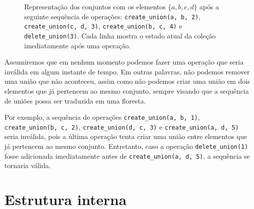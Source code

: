 \begin{figure}[h!]
\begin{subfigure}{\textwidth}
        \bigskip
    \end{subfigure}
    \begin{subfigure}{\textwidth}
        \centering
    \end{subfigure}
    \caption{Representação dos conjuntos com os elementos $\{a,b,c,d\}$ após a seguinte sequência de operações: \texttt{create\_union(a, b, 2)}, \texttt{create\_union(c, d, 3)}, \texttt{create\_union(b, c, 4)} e\\\texttt{delete\_union(3)}. Cada linha mostra o estado atual da coleção imediatamente após uma operação.}
    \label{fig:uf-sets}
\end{figure}

Assumiremos que em nenhum momento podemos fazer uma operação que seria inválida em algum instante de tempo. Em outras palavras, não podemos remover uma união que não aconteceu, assim como não podemos criar uma união em dois elementos que já pertencem ao mesmo conjunto, sempre visando que a sequência de uniões possa ser traduzida em uma floresta.

Por exemplo, a sequência de operações \texttt{create\_union(a, b, 1)}, \texttt{create\_union(b, c, 2)}, \texttt{create\_union(d, c, 3)} e \texttt{create\_union(a, d, 5)} seria inválida, pois a última operação tenta criar uma união entre elementos que já pertencem ao mesmo conjunto. Entretanto, caso a operação \texttt{delete\_union(1)} fosse adicionada imediatamente antes de \texttt{create\_union(a, d, 5)}, a sequência se tornaria válida.

\section{Estrutura interna}
\label{sec:uf-estrutura}

